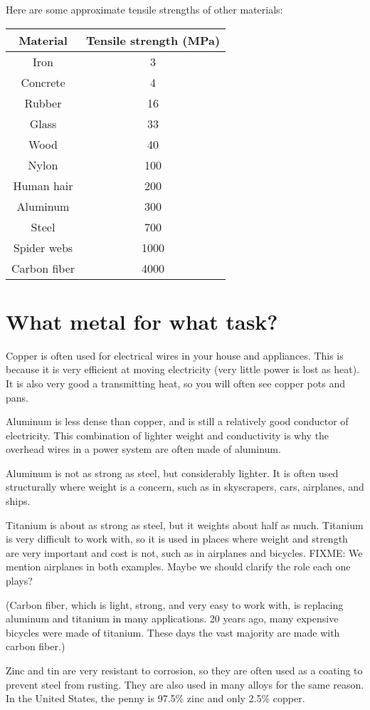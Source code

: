 Here are some approximate tensile strengths of other materials:

\begin{tabular}{c|c}
  Material & Tensile strength (MPa) \\
  \hline
  Iron & 3 \\
  Concrete & 4 \\
  Rubber & 16 \\
  Glass & 33 \\
  Wood & 40 \\
  Nylon & 100 \\
  Human hair & 200 \\
  Aluminum  & 300 \\
  Steel & 700 \\
  Spider webs & 1000 \\
  Carbon fiber & 4000
\end{tabular}

\section{What metal for what task?}

Copper is often used for electrical wires in your house and
appliances. This is because it is very efficient at moving electricity (very
little power is lost as heat). It is also very good a transmitting
heat, so you will often see copper pots and pans.

Aluminum is less dense than copper, and is still a relatively good
conductor of electricity. This combination of lighter weight and conductivity is why the overhead wires in a power system
are often made of aluminum.

Aluminum is not as strong as steel, but considerably lighter. It is
often used structurally where weight is a concern, such as in skyscrapers, cars,
airplanes, and ships.

Titanium is about as strong as steel, but it weights about half as
much. Titanium is very difficult to work with, so it is used in places
where weight and strength are very important and cost is not, such as in
airplanes and bicycles.
FIXME: We mention airplanes in both examples. Maybe we should clarify the role each one plays?

(Carbon fiber, which is light, strong, and very easy to work with, is
replacing aluminum and titanium in many applications. 20 years ago,
many expensive bicycles were made of titanium. These days the vast
majority are made with carbon fiber.)

Zinc and tin are very resistant to corrosion, so they are often used
as a coating to prevent steel from rusting. They are also used in many
alloys for the same reason.  In the United States, the penny is 97.5\%
zinc and only 2.5\% copper.

